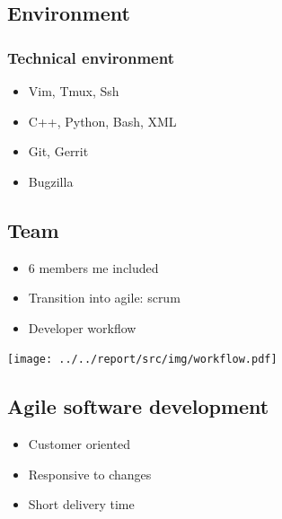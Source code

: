 \subsection{Environment}
\begin{frame}
    \frametitle{Technical environment}
    \begin{itemize}
        \item Vim, Tmux, Ssh
        \item C++, Python, Bash, XML
        \item Git, Gerrit
        \item Bugzilla
    \end{itemize}
\end{frame}

\subsection{Team}
\begin{FrameWithSubSection}
    \begin{minipage}{0.49\textwidth}
        \begin{itemize}
            \item 6 members me included
            \item Transition into agile: scrum
            \item Developer workflow
        \end{itemize}
    \end{minipage}
    \begin{minipage}{0.49\textwidth}
        \flushright
        \texttt{[image: ../../report/src/img/workflow.pdf]}
    \end{minipage}
\end{FrameWithSubSection}

\subsection{Agile software development}
\begin{FrameWithSubSection}
    \begin{itemize}
        \item Customer oriented
        \item Responsive to changes
        \item Short delivery time
    \end{itemize}
\end{FrameWithSubSection}

